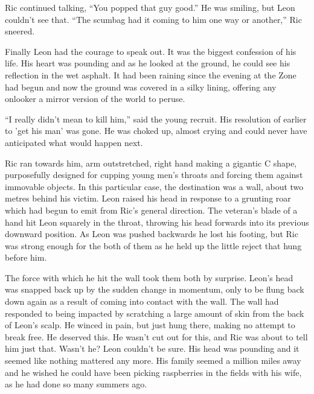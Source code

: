 Ric continued talking, ``You popped that guy good.''  He was smiling, but Leon couldn't see that.  ``The scumbag had it coming to him one way or another,'' Ric sneered.

Finally Leon had the courage to speak out.  It was the biggest confession of his life.  His heart was pounding and as he looked at the ground, he could see his reflection in the wet asphalt.  It had been raining since the evening at the Zone had begun and now the ground was covered in a silky lining, offering any onlooker a mirror version of the world to peruse.  

``I really didn't mean to kill him,'' said the young recruit.  His resolution of earlier to 'get his man' was gone.  He was choked up, almost crying and could never have anticipated what would happen next.

Ric ran towards him, arm outstretched, right hand making a gigantic C shape, purposefully designed for cupping young men's throats and forcing them against immovable objects.  In this particular case, the destination was a wall, about two metres behind his victim.  Leon raised his head in response to a grunting roar which had begun to emit from Ric's general direction.  The veteran's blade of a hand hit Leon squarely in the throat, throwing his head forwards into its previous downward position.  As Leon was pushed backwards he lost his footing, but Ric was strong enough for the both of them as he held up the little reject that hung before him.  

The force with which he hit the wall took them both by surprise.  Leon's head was snapped back up by the sudden change in momentum, only to be flung back down again as a result of coming into contact with the wall.  The wall had responded to being impacted by scratching a large amount of skin from the back of Leon's scalp.  He winced in pain, but just hung there, making no attempt to break free.  He deserved this.  He wasn't cut out for this, and Ric was about to tell him just that.  Wasn't he?  Leon couldn't be sure.  His head was pounding and it seemed like nothing mattered any more.  His family seemed a million miles away and he wished he could have been picking raspberries in the fields with his wife, as he had done so many summers ago.







